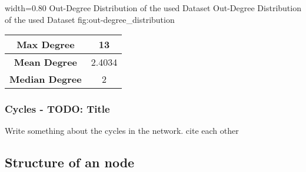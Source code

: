       {width=0.80\textwidth}
      {Out-Degree Distribution of the used Dataset}
      {Out-Degree Distribution of the used Dataset}
      {fig:out-degree_distribution}

    \begin{center}
      \begin{tabular}{ | c | c | }
        \hline
        \textbf{Max Degree} & 13 \\ \hline
        \textbf{Mean Degree} & 2.4034 \\ \hline
        \textbf{Median Degree} & 2 \\ \hline
      \end{tabular}
    \end{center}

\subsubsection{Cycles - TODO: Title}
\label{subsubsec:cycles}
Write something about the cycles in the network. cite each other


\subsection{Structure of an node}
\label{sec:analysis}
